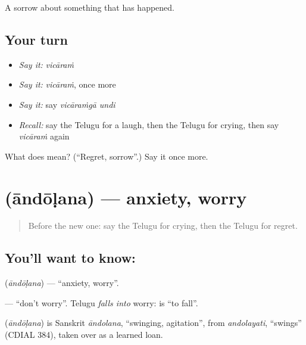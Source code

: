 \begin{grammarlens}[title={What you've built}]
A sorrow about something that has happened.
\end{grammarlens}

\subsection*{Your turn}
\begin{itemize}
\raggedright
  \item \emph{Say it:} \emph{vicāraṁ}
  \item \emph{Say it:} \emph{vicāraṁ}, once more
  \item \emph{Say it:} say \emph{vicāraṁgā undi}
  \item \emph{Recall:} say the Telugu for a laugh, then the Telugu for crying, then say \emph{vicāraṁ} again
\end{itemize}

\begin{tcolorbox}[breakable,colback=teal!4,colframe=teal!35!black,title={Before you move on}]
What does  mean? (\textquotedblleft{}Regret, sorrow\textquotedblright{}.) Say it once more.
\end{tcolorbox}
\section[\texorpdfstring{\te{ఆందోళన} (āndōḷana)}{ఆందోళన (āndōḷana)}]{ (āndōḷana) — anxiety, worry}

\label{lesson:TE-C97-anxiety}



\begin{quote}
Before the new one: say the Telugu for crying, then the Telugu for regret.
\end{quote}

\subsection*{You'll want to know: }
\textbf{} (\emph{āndōḷana}) — \textquotedblleft{}anxiety, worry\textquotedblright{}.

\textbf{ } — \textquotedblleft{}don't worry\textquotedblright{}. Telugu \emph{falls into} worry: \textbf{} is \textquotedblleft{}to fall\textquotedblright{}.

\begin{cousinweb}
\textbf{} (\emph{āndōḷana}) is Sanskrit \emph{āndolana}, \textquotedblleft{}swinging, agitation\textquotedblright{}, from \emph{andolayati}, \textquotedblleft{}swings\textquotedblright{} (CDIAL 384), taken over as a learned loan.
\end{cousinweb}

